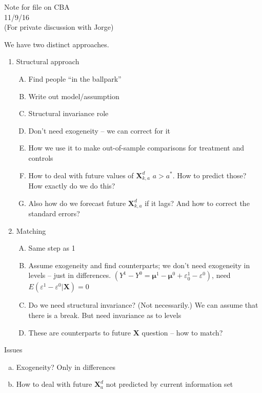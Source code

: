 \begin{center}
Note for file on CBA\\
11/9/16\\
(For private discussion with Jorge)
\end{center}
We have two distinct approaches.
\begin{enumerate}[(1)]
\item Structural approach
    \begin{enumerate}[(A)]
    \item Find people ``in the ballpark''
    \item Write out model/assumption
    \item Structural invariance role
    \item Don't need exogeneity -- we can correct for it
    \item How we use it to make out-of-sample comparisons for treatment and controls
    \item How to deal with future values of $\bm{X}^d_{k,a}$ $a>a^{\ast}$. How to predict those? How exactly do we do this?
    \item Also how do we forecast future $\bm{X}^d_{k,a}$ if it lags? And how to correct the standard errors?
    \end{enumerate}
\item Matching
    \begin{enumerate}[(A)]
    \item Same step as 1
    \item Assume exogeneity and find counterparts; we don't need exogeneity in levels -- just in differences. $(Y^1 - Y^0 = \bm{\mu}^1 - \bm{\mu}^0 + \varepsilon^1_0 - \varepsilon^0)$, need $E(\varepsilon^1 - \varepsilon^0 | \bm{X}) = 0$
    \item Do we need structural invariance? (Not necessarily.) We can assume that there is a break. But need invariance as to levels
    \item These are counterparts to future $\bm{X}$ question -- how to match?
    \end{enumerate}
\end{enumerate}

\noindent Issues
\begin{enumerate}[(a)]
\item Exogeneity? Only in differences
\item How to deal with future $\bm{X}^d_a$ not predicted by current information set
\end{enumerate}


